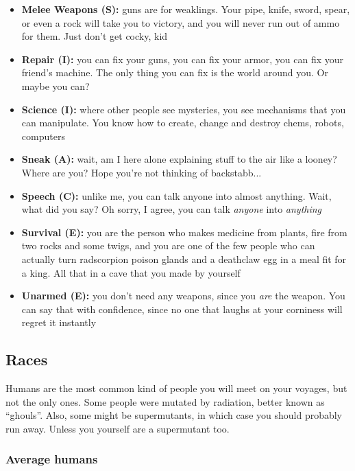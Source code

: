 \documentclass[11pt]{article} %
\begin{document}
\begin{itemize}
\item \textbf{Melee Weapons (S):} guns are for weaklings. Your pipe, knife, sword, spear, or even a rock will take you to victory, and you will never run out of ammo for them. Just don't get cocky, kid

\item \textbf{Repair (I):} you can fix your guns, you can fix your armor, you can fix your friend's machine. The only thing you can fix is the world around you. Or maybe you can?

\item \textbf{Science (I):} where other people see mysteries, you see mechanisms that you can manipulate. You know how to create, change and destroy chems, robots, computers

\item \textbf{Sneak (A):} wait, am I here alone explaining stuff to the air like a looney? Where are you? Hope you're not thinking of backstabb... 

\item \textbf{Speech (C):} unlike me, you can talk anyone into almost anything. Wait, what did you say? Oh sorry, I agree, you can talk \textit{anyone} into \textit{anything}

\item \textbf{Survival (E):} you are the person who makes medicine from plants, fire from two rocks and some twigs, and you are one of the few people who can actually turn radscorpion poison glands and a deathclaw egg in a meal fit for a king. All that in a cave that you made by yourself

\item \textbf{Unarmed (E):} you don't need any weapons, since you \textit{are} the weapon. You can say that with confidence, since no one that laughs at your corniness will regret it instantly

\end{itemize}

\subsection{Races}

Humans are the most common kind of people you will meet on your voyages, but not the only ones. Some people were mutated by radiation, better known as ``ghouls''. Also, some might be supermutants, in which case you should probably run away. Unless you yourself are a supermutant too.

\subsubsection{Average humans} 
\end{document}
